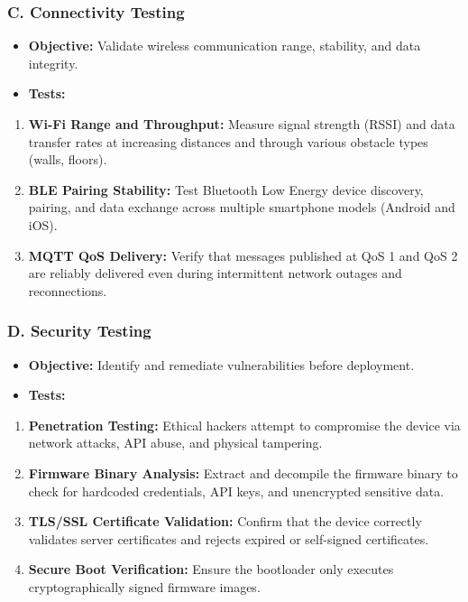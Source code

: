 \subsubsection{C. Connectivity Testing}
\begin{itemize}
  \item   \textbf{Objective:} Validate wireless communication range, stability, and data integrity.
  \item   \textbf{Tests:}
\end{itemize}
\begin{enumerate}
  \item \textbf{Wi-Fi Range and Throughput:} Measure signal strength (RSSI) and data transfer rates at increasing distances and through various obstacle types (walls, floors).
  \item \textbf{BLE Pairing Stability:} Test Bluetooth Low Energy device discovery, pairing, and data exchange across multiple smartphone models (Android and iOS).
  \item \textbf{MQTT QoS Delivery:} Verify that messages published at QoS 1 and QoS 2 are reliably delivered even during intermittent network outages and reconnections.
\end{enumerate}

\subsubsection{D. Security Testing}
\begin{itemize}
  \item   \textbf{Objective:} Identify and remediate vulnerabilities before deployment.
  \item   \textbf{Tests:}
\end{itemize}
\begin{enumerate}
  \item \textbf{Penetration Testing:} Ethical hackers attempt to compromise the device via network attacks, API abuse, and physical tampering.
  \item \textbf{Firmware Binary Analysis:} Extract and decompile the firmware binary to check for hardcoded credentials, API keys, and unencrypted sensitive data.
  \item \textbf{TLS/SSL Certificate Validation:} Confirm that the device correctly validates server certificates and rejects expired or self-signed certificates.
  \item \textbf{Secure Boot Verification:} Ensure the bootloader only executes cryptographically signed firmware images.
\end{enumerate}

